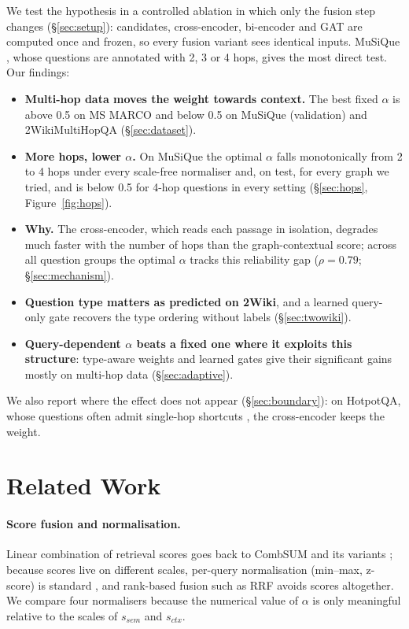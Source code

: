 \documentclass[11pt]{article}
\newcommand{\sem}{s_{\mathit{sem}}}
\newcommand{\ctx}{s_{\mathit{ctx}}}
\begin{document}
We test the hypothesis in a controlled ablation in which only the fusion step changes
(\S\ref{sec:setup}): candidates, cross-encoder, bi-encoder and GAT are computed once and frozen, so
every fusion variant sees identical inputs. MuSiQue \citep{trivedi2022musique}, whose questions are
annotated with 2, 3 or 4 hops, gives the most direct test. Our findings:
\begin{itemize}
\item \textbf{Multi-hop data moves the weight towards context.} The best fixed $\alpha$ is above 0.5 on
  MS MARCO and below 0.5 on MuSiQue (validation) and 2WikiMultiHopQA (\S\ref{sec:dataset}).
\item \textbf{More hops, lower $\alpha$.} On MuSiQue the optimal $\alpha$ falls monotonically from 2 to 4
  hops under every scale-free normaliser and, on test, for every graph we tried, and is below 0.5 for 4-hop questions
  in every setting (\S\ref{sec:hops}, Figure~\ref{fig:hops}).
\item \textbf{Why.} The cross-encoder, which reads each passage in isolation, degrades much faster with
  the number of hops than the graph-contextual score; across all question groups the optimal $\alpha$
  tracks this reliability gap ($\rho=0.79$; \S\ref{sec:mechanism}).
\item \textbf{Question type matters as predicted on 2Wiki}, and a learned query-only gate recovers the
  type ordering without labels (\S\ref{sec:twowiki}).
\item \textbf{Query-dependent $\alpha$ beats a fixed one where it exploits this structure}: type-aware
  weights and learned gates give their significant gains mostly on multi-hop data (\S\ref{sec:adaptive}).
\end{itemize}
We also report where the effect does not appear (\S\ref{sec:boundary}): on HotpotQA, whose questions
often admit single-hop shortcuts \citep{min2019compositional}, the cross-encoder keeps the weight.

\section{Related Work}
\label{sec:related}

\paragraph{Score fusion and normalisation.}
Linear combination of retrieval scores goes back to CombSUM and its variants
\citep{fox1994combination}; because scores live on different scales, per-query normalisation
(min--max, z-score) is standard \citep{montague2001normalization}, and rank-based fusion such as RRF
\citep{cormack2009rrf} avoids scores altogether. We compare four normalisers because the numerical
value of $\alpha$ is only meaningful relative to the scales of $\sem$ and $\ctx$.
\end{document}
